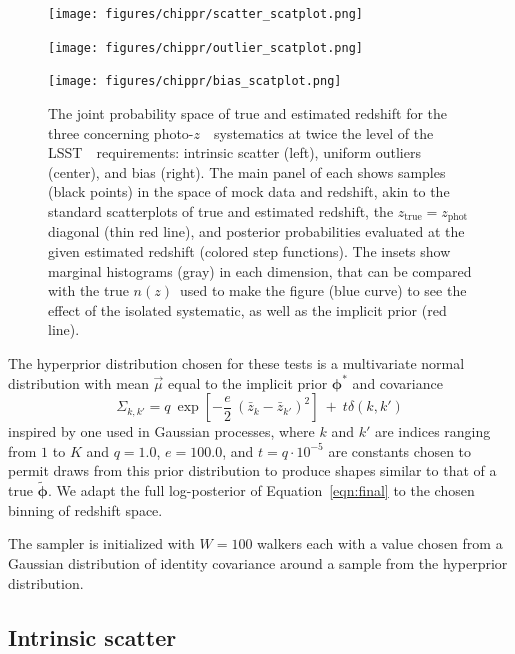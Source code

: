 \documentclass[iop]{emulateapj}
\newcommand{\Eq}[1]{Equation~\ref{#1}}
\newcommand{\project}[1]{{\textsc{#1}}~}
\newcommand{\lsst}{\project{LSST}}
\newcommand{\nz}{$n(z)$}
\newcommand{\pz}{photo-$z$~}
\newcommand{\bvec}[1]{{\ensuremath{\boldsymbol{#1}}}}
\newcommand{\ndphi}{\bvec{\phi}}
\begin{document}
\begin{figure}
	\begin{center}
		
\texttt{[image: figures/chippr/scatter\_scatplot.png]}
		
\texttt{[image: figures/chippr/outlier\_scatplot.png]}
		
\texttt{[image: figures/chippr/bias\_scatplot.png]}
		\caption{The joint probability space of true and estimated 
redshift for the three concerning \pz\ systematics at twice the level of the 
\lsst\ requirements: intrinsic scatter (left), uniform outliers (center), and 
bias (right).
			The main panel of each shows samples (black points) in 
the space of mock data and redshift, akin to the standard scatterplots of true 
and estimated redshift, the $z_{\mathrm{true}} = z_{\mathrm{phot}}$ diagonal 
(thin red line), and posterior probabilities evaluated at the given estimated 
redshift (colored step functions).
			The insets show marginal histograms (gray) in each 
dimension, that can be compared with the true \nz\ used to make the figure 
(blue curve) to see the effect of the isolated systematic, as well as the 
implicit prior (red line).
		}
		\label{fig:mega_scatter}
	\end{center}
\end{figure}

The hyperprior distribution chosen for these tests is a multivariate normal 
distribution with mean $\vec{\mu}$ equal to the implicit prior $\ndphi^{*}$ and 
covariance
\begin{equation}
\label{eqn:priorcov}
\Sigma_{k,k'} = q\ \exp[-\frac{e}{2}\ (\bar{z}_{k}-\bar{z}_{k'})^{2}]\ +\ 
t\delta(k,k')
\end{equation}
inspired by one used in Gaussian processes, where $k$ and $k'$ are indices 
ranging from $1$ to $K$ and $q=1.0$, $e=100.0$, and $t=q\cdot10^{-5}$ are 
constants chosen to permit draws from this prior distribution to produce shapes 
similar to that of a true $\tilde{\ndphi}$.  
We adapt the full log-posterior of \Eq{eqn:final} to the chosen binning of 
redshift space.


The sampler is initialized with $W=100$ walkers each with a value chosen from a 
Gaussian distribution of identity covariance around a sample from the 
hyperprior distribution.  

\subsection{Intrinsic scatter}
\label{sec:scatter}
\end{document}

